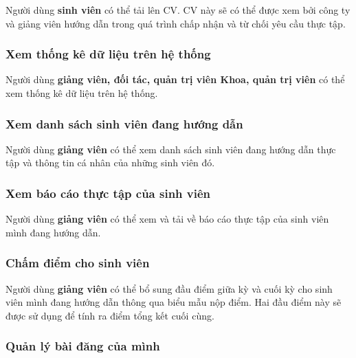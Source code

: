 \documentclass[./../main.tex]{subfiles}
\begin{document}
Người dùng \textbf{sinh viên} có thể tải lên CV. CV này sẽ có thể được
xem bởi công ty và giảng viên hướng dẫn trong quá trình chấp nhận và từ
chối yêu cầu thực tập.
  
\hypertarget{xem-thux1ed1ng-kuxea-dux1eef-liux1ec7u-truxean-hux1ec7-thux1ed1ng}{%
	\subsubsection{Xem thống kê dữ liệu trên hệ
		thống}\label{xem-thux1ed1ng-kuxea-dux1eef-liux1ec7u-truxean-hux1ec7-thux1ed1ng}}
  
Người dùng \textbf{giảng viên, đối tác, quản trị viên Khoa, quản trị
viên} có thể xem thống kê dữ liệu trên hệ thống.
  
\hypertarget{xem-danh-suxe1ch-sinh-viuxean-ux111ang-hux1b0ux1edbng-dux1eabn}{%
	\subsubsection{Xem danh sách sinh viên đang hướng
		dẫn}\label{xem-danh-suxe1ch-sinh-viuxean-ux111ang-hux1b0ux1edbng-dux1eabn}}
  
Người dùng \textbf{giảng viên} có thể xem danh sách sinh viên đang hướng
dẫn thực tập và thông tin cá nhân của những sinh viên đó.
  
\hypertarget{xem-buxe1o-cuxe1o-thux1ef1c-tux1eadp-cux1ee7a-sinh-viuxean}{%
	\subsubsection{Xem báo cáo thực tập của sinh
		viên}\label{xem-buxe1o-cuxe1o-thux1ef1c-tux1eadp-cux1ee7a-sinh-viuxean}}
  
Người dùng \textbf{giảng viên} có thể xem và tải về báo cáo thực tập của
sinh viên mình đang hướng dẫn.
  
\hypertarget{chux1ea5m-ux111iux1ec3m-cho-sinh-viuxean}{%
	\subsubsection{Chấm điểm cho sinh
		viên}\label{chux1ea5m-ux111iux1ec3m-cho-sinh-viuxean}}
  
Người dùng \textbf{giảng viên} có thể bổ sung đầu điểm giữa kỳ và cuối
kỳ cho sinh viên mình đang hướng dẫn thông qua biểu mẫu nộp điểm. Hai
đầu điểm này sẽ được sử dụng để tính ra điểm tổng kết cuối cùng.
  
\hypertarget{quux1ea3n-luxfd-buxe0i-ux111ux103ng-cux1ee7a-muxecnh}{%
	\subsubsection{Quản lý bài đăng của
		mình}\label{quux1ea3n-luxfd-buxe0i-ux111ux103ng-cux1ee7a-muxecnh}}
  
\end{document}
